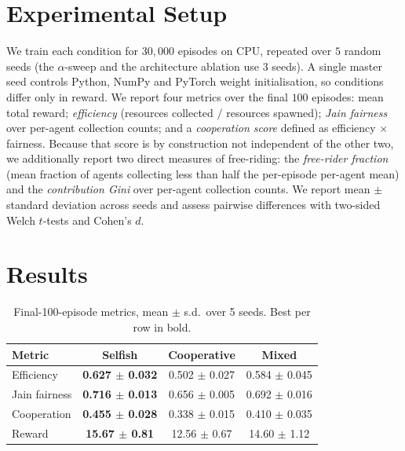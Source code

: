 \documentclass[sigconf,nonacm,anonymous,review]{acmart}
\begin{document}
\section{Experimental Setup}
\label{sec:setup}
We train each condition for $30{,}000$ episodes on CPU, repeated over $5$ random seeds
(the $\alpha$-sweep and the architecture ablation use $3$ seeds). A single master seed
controls Python, NumPy and PyTorch weight initialisation, so conditions differ only in reward. We report four metrics over the final $100$ episodes:
mean total reward; \emph{efficiency} (resources collected $/$ resources spawned);
\emph{Jain fairness}~\cite{jain1984fairness} over per-agent collection counts; and a
\emph{cooperation score} defined as efficiency $\times$ fairness. Because that score is by
construction not independent of the other two, we additionally report two direct measures of
free-riding: the \emph{free-rider fraction} (mean fraction of agents collecting less than half
the per-episode per-agent mean) and the \emph{contribution Gini} over per-agent collection
counts. We report mean $\pm$ standard deviation across seeds and assess pairwise differences
with two-sided Welch $t$-tests and Cohen's $d$.

\section{Results}
\label{sec:results}

\begin{table}[t]
\caption{Final-100-episode metrics, mean $\pm$ s.d.\ over 5 seeds. Best per row in bold.}
\label{tab:main}
\begin{tabular}{lccc}
\toprule
Metric & Selfish & Cooperative & Mixed \\
\midrule
Efficiency    & \textbf{0.627 $\pm$ 0.032} & 0.502 $\pm$ 0.027 & 0.584 $\pm$ 0.045 \\
Jain fairness & \textbf{0.716 $\pm$ 0.013} & 0.656 $\pm$ 0.005 & 0.692 $\pm$ 0.016 \\
Cooperation   & \textbf{0.455 $\pm$ 0.028} & 0.338 $\pm$ 0.015 & 0.410 $\pm$ 0.035 \\
Reward        & \textbf{15.67 $\pm$ 0.81}  & 12.56 $\pm$ 0.67  & 14.60 $\pm$ 1.12  \\
\bottomrule
\end{tabular}
\end{table}
\end{document}
